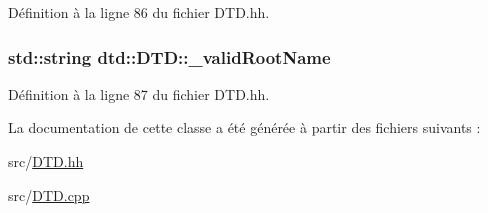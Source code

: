 Définition à la ligne 86 du fichier DTD.hh.

\hypertarget{classdtd_1_1_d_t_d_ae2c393aa68abc63e9c5afe34770a75f5}{
\subsubsection[{\_\-validRootName}]{\setlength{\rightskip}{0pt plus 5cm}std::string {\bf dtd::DTD::\_\-validRootName}}}
\label{classdtd_1_1_d_t_d_ae2c393aa68abc63e9c5afe34770a75f5}


Définition à la ligne 87 du fichier DTD.hh.



La documentation de cette classe a été générée à partir des fichiers suivants :\begin{DoxyCompactItemize}
\item 
src/\hyperlink{_d_t_d_8hh}{DTD.hh}\item 
src/\hyperlink{_d_t_d_8cpp}{DTD.cpp}\end{DoxyCompactItemize}
